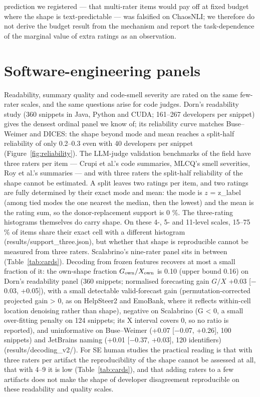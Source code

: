 \documentclass{article}
\begin{document}
prediction we registered --- that multi-rater items would pay off at fixed budget where the shape is text-predictable --- was falsified on ChaosNLI; we therefore do not derive the budget result from the mechanism and report the task-dependence of the marginal value of extra ratings as an observation.

\section{Software-engineering panels}

Readability, summary quality and code-smell severity are rated on the same few-rater scales, and the same questions arise for code judges. Dorn's readability study (360 snippets in Java, Python and CUDA; 161--267 developers per snippet) gives the densest ordinal panel we know of; its reliability curve matches Buse--Weimer and DICES: the shape beyond mode and mean reaches a split-half reliability of only 0.2--0.3 even with 40 developers per snippet (Figure~\ref{fig:reliability}). The LLM-judge validation benchmarks of the field have three raters per item --- Crupi et al.'s code summaries, MLCQ's smell severities, Roy et al.'s summaries --- and with three raters the split-half reliability of the shape cannot be estimated. A split leaves two ratings per item, and two ratings are fully determined by their exact mode and mean: the mode is \(z\) = z\_label (among tied modes the one nearest the median, then the lowest) and the mean is the rating sum, so the donor-replacement support is 0 \%. The three-rating histograms themselves do carry shape. On these 4-, 5- and 11-level scales, 15--75 \% of items share their exact cell with a different histogram (results/support\_three.json), but whether that shape is reproducible cannot be measured from three raters. Scalabrino's nine-rater panel sits in between (Table~\ref{tab:cards}). Decoding from frozen features recovers at most a small fraction of it: the own-shape fraction \(G_{\rm own}/X_{\rm own}\) is 0.10 (upper bound 0.16) on Dorn's readability panel (360 snippets; normalised forecasting gain \(G/X\) +0.03 {[}$-$0.03, +0.05{]}), with a small detectable valid-forecast gain (permutation-corrected projected gain \textgreater{} 0, as on HelpSteer2 and EmoBank, where it reflects within-cell location denoising rather than shape), negative on Scalabrino (G \textless{} 0, a small over-fitting penalty on 124 snippets; its X interval covers 0, so no ratio is reported), and uninformative on Buse--Weimer (+0.07 {[}$-$0.07, +0.26{]}, 100 snippets) and JetBrains naming (+0.01 {[}$-$0.37, +0.03{]}, 120 identifiers) (results/decoding\_v2/). For SE human studies the practical reading is that with three raters per artifact the reproducibility of the shape cannot be assessed at all, that with 4--9 it is low (Table~\ref{tab:cards}), and that adding raters to a few artifacts does not make the shape of developer disagreement reproducible on these readability and quality scales.
\end{document}
